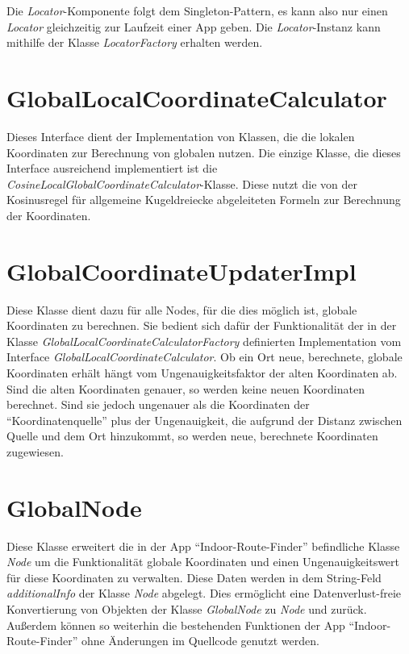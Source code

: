 Die \textit{Locator}-Komponente folgt dem Singleton-Pattern, es kann also nur einen \textit{Locator} gleichzeitig zur Laufzeit einer App geben. Die \textit{Locator}-Instanz kann mithilfe der Klasse \textit{LocatorFactory} erhalten werden.

\section{GlobalLocalCoordinateCalculator}
Dieses Interface dient der Implementation von Klassen, die die lokalen Koordinaten zur Berechnung von globalen nutzen. Die einzige Klasse, die dieses Interface ausreichend implementiert ist die \textit{CosineLocalGlobalCoordinateCalculator}-Klasse. Diese nutzt die von der Kosinusregel für allgemeine Kugeldreiecke abgeleiteten Formeln zur Berechnung der Koordinaten.

\section{GlobalCoordinateUpdaterImpl}
Diese Klasse dient dazu für alle Nodes, für die dies möglich ist, globale Koordinaten zu berechnen. Sie bedient sich dafür der Funktionalität der in der Klasse \textit{GlobalLocalCoordinateCalculatorFactory} definierten Implementation vom Interface \textit{GlobalLocalCoordinateCalculator}. Ob ein Ort neue, berechnete, globale Koordinaten erhält hängt vom Ungenauigkeitsfaktor der alten Koordinaten ab. Sind die alten Koordinaten genauer, so werden keine neuen Koordinaten berechnet. Sind sie jedoch ungenauer als die Koordinaten der \enquote{Koordinatenquelle} plus der Ungenauigkeit, die aufgrund der Distanz zwischen Quelle und dem Ort hinzukommt, so werden neue, berechnete Koordinaten zugewiesen.

\section{GlobalNode}
Diese Klasse erweitert die in der App \enquote{Indoor-Route-Finder} befindliche Klasse \textit{Node} um die Funktionalität globale Koordinaten und einen Ungenauigkeitswert für diese Koordinaten zu verwalten. Diese Daten werden in dem String-Feld \textit{additionalInfo} der Klasse \textit{Node} abgelegt. Dies ermöglicht eine Datenverlust-freie Konvertierung von Objekten der Klasse \textit{GlobalNode} zu \textit{Node} und zurück. Außerdem können so weiterhin die bestehenden Funktionen der App \enquote{Indoor-Route-Finder} ohne Änderungen im Quellcode genutzt werden.